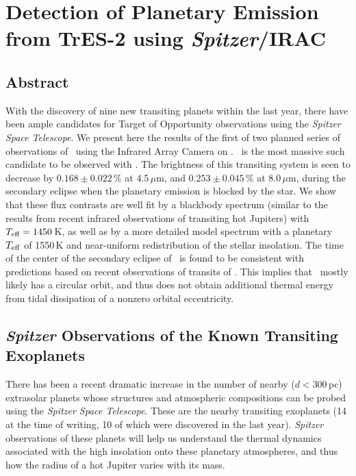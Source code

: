 \chapter[Detection of Planetary Emission from TrES-2 using \emph{Spitzer}/ IRAC]
{%
Detection of Planetary Emission from TrES-2 using \emph{Spitzer}/IRAC%
\protect\CFNE%
}
\label{cha:spitzer}

\section*{Abstract}
\label{cha:spitzer:sec:abs}

With the discovery of nine new transiting planets within the last year, there have been ample candidates for Target of Opportunity observations using the {\it Spitzer Space Telescope}. 
We present here the results of the first of two planned series of observations of \tresTwo\ using the Infrared Array Camera on \spi. 
\tresTwo\ is the most massive such candidate to be observed with \spi.
The brightness of this transiting system is seen to decrease by \mbox{$0.168 \pm 0.022$\,\%} at 4.5\,$\mu$m, and \mbox{$0.253 \pm 0.045$\,\%} at 8.0\,$\mu$m, during the secondary eclipse when the planetary emission is blocked by the star. 
We show that these flux contrasts are well fit by a blackbody spectrum (similar to the results from recent infrared observations of transiting hot Jupiters) with \mbox{$T_{\rm eff}=1450$\,K}, as well as by a more detailed model spectrum with a planetary $T_{\rm eff}$ of 1550\,K and near-uniform redistribution of the stellar insolation.
The time of the center of the secondary eclipse of \tresTwo\ is found to be consistent with predictions based on recent observations of transits of \tresTwo. 
This implies that \tresTwo\ mostly likely has a circular orbit, and thus does not obtain additional thermal energy from tidal dissipation of a nonzero orbital eccentricity.

\section[\textit{Spitzer} Observations of the Known Transiting Exoplanets]{\textbf{\textit{Spitzer}} Observations of the Known Transiting Exoplanets}
\label{cha:spitzer:sec:intro}

There has been a recent dramatic increase in the number of nearby ($d<300$\,pc) extrasolar planets whose structures and atmospheric compositions can be probed using the {\it Spitzer Space Telescope}. 
These are the nearby transiting exoplanets (14 at the time of writing, 10 of which were discovered in the last year). 
{\it Spitzer} observations of these planets will help us understand the thermal dynamics associated with the high insolation onto these planetary atmospheres, and thus how the radius of a hot Jupiter varies with its mass.

